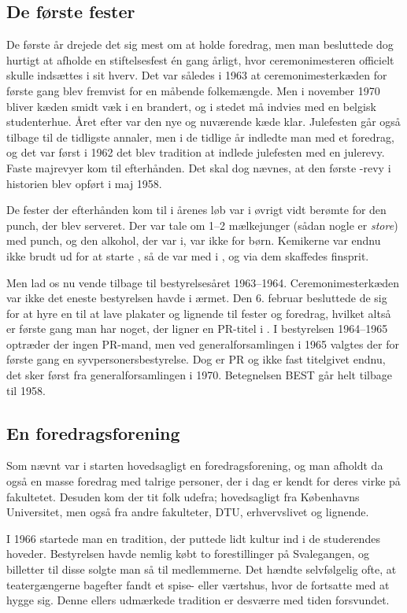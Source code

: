 \subsection{De første fester}
De første år drejede det sig mest om at holde foredrag, men man besluttede dog hurtigt at afholde en stiftelsesfest én gang årligt, hvor ceremonimesteren officielt skulle indsættes i sit hverv. Det var således i 1963 at ceremonimesterkæden for første gang blev fremvist for en måbende folkemængde. Men i november 1970 bliver kæden smidt væk i en brandert, og i stedet må \CERM indvies med en belgisk studenterhue. Året efter var den nye og nuværende kæde klar. Julefesten går også tilbage til de tidligste annaler, men i de tidlige år indledte man med et foredrag, og det var først i 1962 det blev tradition at indlede julefesten med en julerevy. Faste majrevyer kom til efterhånden. Det skal dog nævnes, at den første \TK-revy i historien blev opført i maj 1958.

De fester der efterhånden kom til i årenes løb var i øvrigt vidt berømte for den punch, der blev serveret. Der var tale om 1--2 mælkejunger (sådan nogle er \textit{store}) med punch, og den alkohol, der var i, var ikke for børn. Kemikerne var endnu ikke brudt ud for at starte \alkymia, så de var med i \TKET, og via dem skaffedes finsprit.

Men lad os nu vende tilbage til bestyrelsesåret 1963--1964. Ceremonimesterkæden var ikke det eneste bestyrelsen havde i ærmet. Den 6. februar besluttede de sig for at hyre en til at lave plakater og lignende til fester og foredrag, hvilket altså er første gang man har noget, der ligner en PR-titel i \TKET. I bestyrelsen 1964--1965 optræder der ingen PR-mand, men ved generalforsamlingen i 1965 valgtes der for første gang en syvpersonersbestyrelse. Dog er PR og \VC ikke fast titelgivet endnu, det sker først fra generalforsamlingen i 1970. Betegnelsen BEST går helt tilbage til 1958.

\subsection{En foredragsforening}
Som nævnt var \TKET i starten hovedsagligt en foredragsforening, og man afholdt da også en masse foredrag med talrige personer, der i dag er kendt for deres virke på fakultetet. Desuden kom der tit folk udefra; hovedsagligt fra Københavns Universitet, men også fra andre fakulteter, DTU, erhvervslivet og lignende.

I 1966 startede man en tradition, der puttede lidt kultur ind i de studerendes hoveder. Bestyrelsen havde nemlig købt to forestillinger på Svalegangen, og billetter til disse solgte man så til medlemmerne. Det hændte selvfølgelig ofte, at teatergængerne bagefter fandt et spise- eller værtshus, hvor de fortsatte med at hygge sig. Denne ellers udmærkede tradition er desværre med tiden forsvundet.

